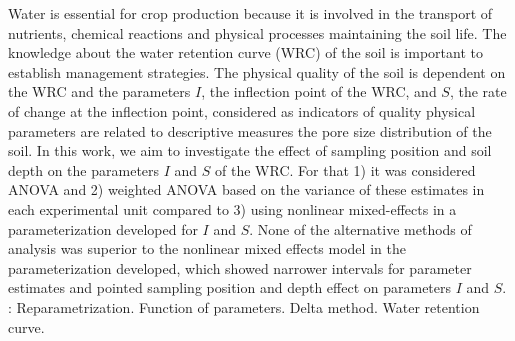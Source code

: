 Water is essential for crop production because it is involved in the
transport of nutrients, chemical reactions and physical processes
maintaining the soil life. The knowledge about the water retention
curve (WRC) of the soil is important to establish management
strategies. The physical quality of the soil is dependent on the WRC
and the parameters $I$, the inflection point of the WRC, and $S$, the
rate of change at the inflection point, considered as indicators of
quality physical parameters are related to descriptive measures the
pore size distribution of the soil. In this work, we aim to
investigate the effect of sampling position and soil depth on the
parameters $I$ and $S$ of the WRC. For that 1) it was considered ANOVA
and 2) weighted ANOVA based on the variance of these estimates in each
experimental unit compared to 3) using nonlinear mixed-effects in a
parameterization developed for $I$ and $S$. None of the alternative
methods of analysis was superior to the nonlinear mixed effects model
in the parameterization developed, which showed narrower intervals for
parameter estimates and pointed sampling position and depth effect on
parameters $I$ and $S$.\\
\newline
{}: Reparametrization. Function of parameters. Delta method. Water retention curve.
